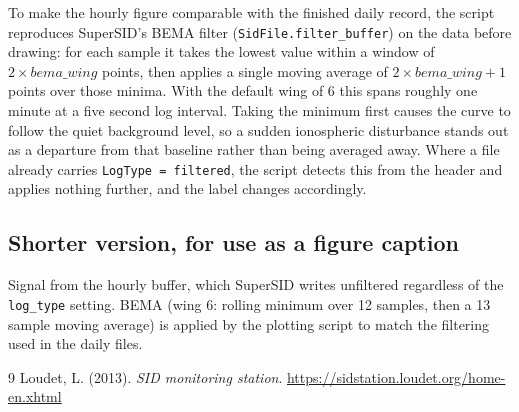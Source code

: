 \documentclass[11pt,a4paper]{article}
\begin{document}
To make the hourly figure comparable with the finished daily record, the script
reproduces SuperSID's BEMA filter (\texttt{SidFile.filter\_buffer}) on the data
before drawing: for each sample it takes the lowest value within a window of
$2 \times \mathit{bema\_wing}$ points, then applies a single moving average of
$2 \times \mathit{bema\_wing} + 1$ points over those minima. With the default
wing of 6 this spans roughly one minute at a five second log interval. Taking
the minimum first causes the curve to follow the quiet background level, so a
sudden ionospheric disturbance stands out as a departure from that baseline
rather than being averaged away. Where a file already carries
\texttt{LogType = filtered}, the script detects this from the header and applies
nothing further, and the label changes accordingly.

\subsection*{Shorter version, for use as a figure caption}

Signal from the hourly buffer, which SuperSID writes unfiltered regardless of
the \texttt{log\_type} setting. BEMA (wing 6: rolling minimum over 12 samples,
then a 13 sample moving average) is applied by the plotting script to match the
filtering used in the daily files.

\begin{thebibliography}{9}
Loudet, L. (2013).
\newblock \emph{SID monitoring station}.
\newblock \url{https://sidstation.loudet.org/home-en.xhtml}
\end{thebibliography}
\end{document}
